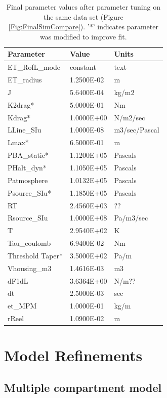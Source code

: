 \documentclass[letterpaper]{article}
\begin{document}
\begin{table}\centering
\begin{tabular}{l|l|l}
Parameter    &     Value    &   Units \\ \hline
ET\_RofL\_mode  &  constant & text \\
ET\_radius  &  1.2500E-02 & m \\
J  &  5.6400E-04 & kg/m2 \\
K2drag*  &  5.0000E-01 & Nm \\
Kdrag*  &  1.0000E+00 & N/m2/sec \\
LLine\_SIu  &  1.0000E-08 & m3/sec/Pascal \\
Lmax*  &  6.5000E-01 & m \\
PBA\_static*  &  1.1200E+05 & Pascals \\
PHalt\_dyn*  &  1.1050E+05 & Pascals \\
Patmosphere  &  1.0132E+05 & Pascals \\
Psource\_SIu*  &  1.1850E+05 & Pascals \\
RT  &  2.4560E+03 & ?? \\
Rsource\_SIu  &  1.0000E+08 & Pa/m3/sec \\
T  &  2.9540E+02 & K \\
Tau\_coulomb  &  6.9400E-02 & Nm \\
Threshold Taper* & 3.5000E+02  &  Pa/m \\
Vhousing\_m3  &  1.4616E-03 & m3 \\
dF1dL  &  3.6364E+00 & N/m?? \\
dt  &  2.5000E-03 & sec \\
et\_MPM  &  1.0000E-01 & kg/m \\
rReel  &  1.0900E-02 & m \\
\end{tabular}
\caption{Final  parameter values after parameter tuning on the
same data set (Figure \ref{Fig:FinalSimCompare}). '*' indicates parameter was
modified to improve fit.}\label{Tab:FinalParams}
\end{table}

\clearpage


\section{Model Refinements}


\subsection{Multiple compartment model}
\end{document}
